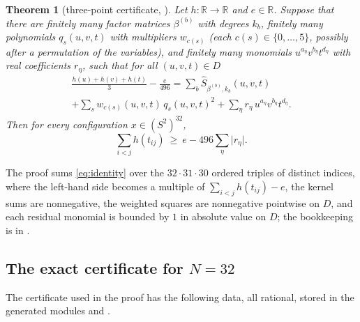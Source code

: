 \documentclass[11pt]{amsart}
\newtheorem{theorem}{Theorem}[section]
\theoremstyle{definition}
\theoremstyle{remark}
\newcommand{\R}{\mathbb{R}}
\newcommand{\Sph}{S^{2}}
\newcommand{\abs}[1]{\lvert #1\rvert}
\begin{document}
\begin{theorem}[three-point certificate, ]\label{thm:certificate}
Let $h\colon\R\to\R$ and $e\in\R$. Suppose that there are finitely many factor matrices $\beta^{(b)}$ with degrees $k_b$, finitely many polynomials $q_s(u,v,t)$ with multipliers $w_{c(s)}$ (each $c(s)\in\{0,\dots,5\}$, possibly after a permutation of the variables), and finitely many monomials $u^{a_\eta}v^{b_\eta}t^{d_\eta}$ with real coefficients $r_\eta$, such that for all $(u,v,t)\in D$
\begin{multline}\label{eq:identity}
  \frac{h(u)+h(v)+h(t)}{3}-\frac{e}{496}
  =\sum_{b}\widehat S_{\beta^{(b)},k_b}(u,v,t)\\
  +\sum_{s}w_{c(s)}(u,v,t)\,q_s(u,v,t)^{2}+\sum_{\eta}r_\eta\,u^{a_\eta}v^{b_\eta}t^{d_\eta}.
\end{multline}
Then for every configuration $x\in(\Sph)^{32}$,
\[
  \sum_{i<j}h(t_{ij})\ \ge\ e-496\sum_{\eta}\abs{r_\eta}.
\]
\end{theorem}

The proof sums \eqref{eq:identity} over the $32\cdot31\cdot30$ ordered triples of distinct indices, where the left-hand side becomes a multiple of $\sum_{i<j}h(t_{ij})-e$, the kernel sums are nonnegative, the weighted squares are nonnegative pointwise on $D$, and each residual monomial is bounded by $1$ in absolute value on $D$; the bookkeeping is in .

\subsection{The exact certificate for $N=32$}\label{sec:exactcert}

The certificate used in the proof has the following data, all rational, stored in the generated modules  and .
\end{document}
